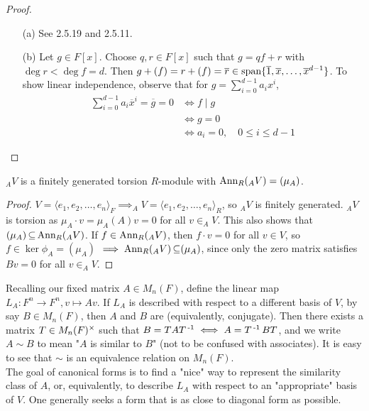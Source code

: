 \documentclass[11pt]{book}
\theoremstyle{definition}   \newtheorem{defn}[counter]{Definition} %
\newcommand{\ov}{\overline}   \newcommand{\wt}{\widetilde}
\newcommand{\gen}[1]{\langle #1 \rangle}   \newcommand{\stab}[2]{\tn{Stab}_{#1}(#2)}   \newcommand{\fix}[2]{\tn{Fix}_{#1}(#2)}   \newcommand{\op}{^{\tn{op}}}
\newcommand{\ann}[2]{\textnormal{Ann}_{#1}(#2)}   \newcommand{\rk}{\textnormal{rk}}
\DeclareMathOperator{\ra}{\rightarrow}   \DeclareMathOperator{\Poly}{\mathbf{P}}   \DeclareMathOperator{\spn}{\textnormal{span}}   \DeclareMathOperator{\aut}{\textnormal{Aut}}
\newcommand{\vs}{\vspace{8pt}}
\numberwithin{counter}{chapter}
\begin{document}
\begin{proof}\
\begin{enumerate}
\item[(a)] See 2.5.19 and 2.5.11.
\item[(b)] Let $g \in F[x]$. Choose $q,r \in F[x]$ such that $g = qf + r$ with $\deg r < \deg f = d$. Then $g + (f) = r + (f) = \ov{r} \in \spn\{\ov{1},\ov{x},\dots,\ov{x}^{d-1}\}$. To show linear independence, observe that for $g = \sum_{i=0}^{d-1} a_i x^i$,
\begin{align*}
\sum_{i=0}^{d-1} a_i \ov{x}^i = \ov{g} = 0 & \iff f \mid g \\
&\iff g = 0 \tag{since $\deg g < \deg f$} \\
&\iff a_i = 0, \quad 0 \leq i \leq d-1
\end{align*}
\end{enumerate}
\end{proof}

\vs

\begin{lemma}
$_AV$ is a finitely generated torsion $R$-module with $\ann{R}{_AV} = (\mu_A)$.
\end{lemma}

\begin{proof}
$V = \gen{e_1,e_2,\dots,e_n}_F \implies _AV = \gen{e_1,e_2,\dots,e_n}_R$, so $_AV$ is finitely generated. $_AV$ is torsion as $\mu_A \cdot v = \mu_A(A) v = 0$ for all $v \in _AV$. This also shows that $(\mu_A) \sub \ann{R}{_AV}$. If $f \in \ann{R}{_AV}$, then $f \cdot v = 0$ for all $v \in V$, so $f \in \ker \phi_A = (\mu_A)$ $\implies \ann{R}{_AV} \sub (\mu_A)$, since only the zero matrix satisfies $B v = 0$ for all $v \in _AV$.
\end{proof}

Recalling our fixed matrix $A \in M_n(F)$, define the linear map $L_A : F^n \ra F^n, v \mapsto Av$. If $L_A$ is described with respect to a different basis of $V$, by say $B \in M_n(F)$, then $A$ and $B$ are  (equivalently, conjugate). Then there exists a matrix $T \in M_n(F)^{\times}$ such that $B = TAT\operatorname{^{-1}} \iff A = T\operatorname{^{-1}} BT$, and we write $A \sim B$ to mean "$A$ is similar to $B$" (not to be confused with associates). It is easy to see that $\sim$ is an equivalence relation on $M_n(F)$. \\

The goal of canonical forms is to find a "nice" way to represent the similarity class of $A$, or, equivalently, to describe $L_A$ with respect to an "appropriate" basis of $V$. One generally seeks a form that is as close to diagonal form as possible.
\end{document}
